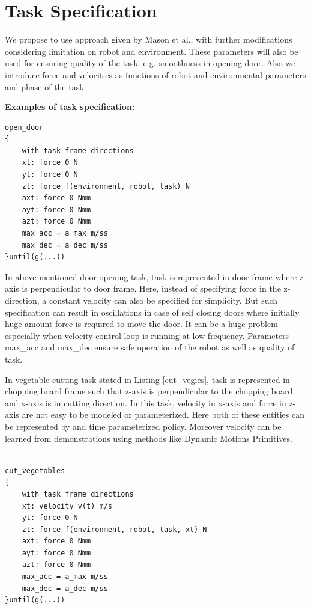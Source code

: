 \documentclass[thesis]{mas_proposal}
\begin{document}
\section{Task Specification}
We propose to use approach given by Mason et al.\cite{mason1981compliance}, with further modifications considering limitation on robot and environment. These parameters will also be used for ensuring quality of the task. e.g. smoothness in opening door. Also we introduce force and velocities as functions of robot and environmental parameters and phase of the task. 

\textbf{Examples of task specification:} 
\begin{lstlisting}[label=open_door_ts,caption=Task specification for opening door]
open_door
{
	with task frame directions
	xt: force 0 N
	yt: force 0 N
	zt: force f(environment, robot, task) N
	axt: force 0 Nmm
	ayt: force 0 Nmm
	azt: force 0 Nmm
	max_acc = a_max m/ss
	max_dec = a_dec m/ss
}until(g(...))

\end{lstlisting}

In above mentioned door opening task, task is represented in door frame where z-axis is perpendicular to door frame. Here, instead of specifying force in the z-direction, a constant velocity can also be specified for simplicity. But such specification can result in oscillations in case of self closing doors where initially huge amount force is required to move the door. It can be a huge problem especially when velocity control loop is running at low frequency. Parameters max\_acc and max\_dec ensure safe operation of the robot as well as quality of task.


In vegetable cutting task stated in Listing \ref{cut_vegies}, task is represented in chopping board frame such that z-axis is perpendicular to the chopping board and x-axis is in cutting direction. In this task, velocity in x-axis and force in z-axis are not easy to be modeled or parameterized. Here both of these entities can be represented by and time parameterized policy. Moreover velocity can be learned from demonstrations using methods like Dynamic Motions Primitives\cite{lioutikov2016learning}. 
\newpage
\begin{lstlisting}[label=cut_vegies,caption=Task specification for cutting vegetables]

cut_vegetables
{
	with task frame directions
	xt: velocity v(t) m/s
	yt: force 0 N
	zt: force f(environment, robot, task, xt) N
	axt: force 0 Nmm
	ayt: force 0 Nmm
	azt: force 0 Nmm
	max_acc = a_max m/ss
	max_dec = a_dec m/ss
}until(g(...))

\end{lstlisting}
\end{document}

